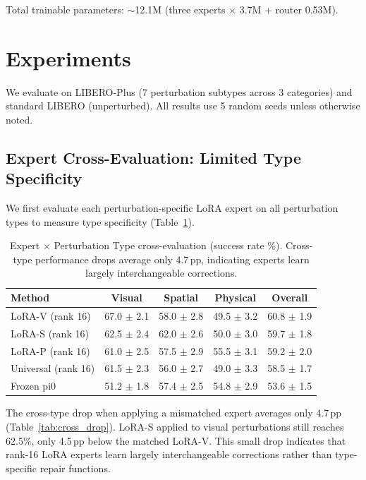 \documentclass[letterpaper]{article}
\newcommand{\pp}{\,\text{pp}}
\begin{document}
Total trainable parameters: $\sim$12.1M (three experts $\times$ 3.7M + router 0.53M).

\section{Experiments}
\label{sec:experiments}

We evaluate on LIBERO-Plus (7 perturbation subtypes across 3 categories) and standard LIBERO (unperturbed). All results use 5 random seeds unless otherwise noted.

\subsection{Expert Cross-Evaluation: Limited Type Specificity}
\label{sec:cross_eval}

We first evaluate each perturbation-specific LoRA expert on all perturbation types to measure type specificity (Table~\ref{tab:cross_eval}).

\begin{table}[h]
\centering
\caption{Expert $\times$ Perturbation Type cross-evaluation (success rate \%). Cross-type performance drops average only 4.7$\pp$, indicating experts learn largely interchangeable corrections.}
\label{tab:cross_eval}
\small
\begin{tabular}{lcccc}
\toprule
\textbf{Method} & \textbf{Visual} & \textbf{Spatial} & \textbf{Physical} & \textbf{Overall} \\
\midrule
LoRA-V (rank 16) & 67.0 $\pm$ 2.1 & 58.0 $\pm$ 2.8 & 49.5 $\pm$ 3.2 & 60.8 $\pm$ 1.9 \\
LoRA-S (rank 16) & 62.5 $\pm$ 2.4 & 62.0 $\pm$ 2.6 & 50.0 $\pm$ 3.0 & 59.7 $\pm$ 1.8 \\
LoRA-P (rank 16) & 61.0 $\pm$ 2.5 & 57.5 $\pm$ 2.9 & 55.5 $\pm$ 3.1 & 59.2 $\pm$ 2.0 \\
Universal (rank 16) & 61.5 $\pm$ 2.3 & 56.0 $\pm$ 2.7 & 49.0 $\pm$ 3.3 & 58.5 $\pm$ 1.7 \\
Frozen pi0 & 51.2 $\pm$ 1.8 & 57.4 $\pm$ 2.5 & 54.8 $\pm$ 2.9 & 53.6 $\pm$ 1.5 \\
\bottomrule
\end{tabular}
\end{table}

The cross-type drop when applying a mismatched expert averages only 4.7$\pp$ (Table~\ref{tab:cross_drop}). LoRA-S applied to visual perturbations still reaches 62.5\%, only 4.5$\pp$ below the matched LoRA-V. This small drop indicates that rank-16 LoRA experts learn largely interchangeable corrections rather than type-specific repair functions.
\end{document}

